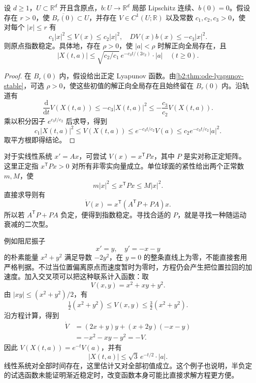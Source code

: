 \begin{proposition}\label{b2:prop:ode-lyapunov-exponential}
设 \(d\geq1\)，\(U\subset\mathbb R^d\) 开且含原点，\(b:U\to\mathbb R^d\) 局部 Lipschitz 连续、\(b(0)=0\)。假设存在 \(r>0\)，使 \(\overline{B_r(0)}\subset U\)，并存在 \(V\in C^1(U;\mathbb R)\) 以及常数 \(c_1,c_2,c_3>0\)，使对每个 \(|x|\leq r\) 有
\[
 c_1|x|^2\leq V(x)\leq c_2|x|^2,
 \quad DV(x)b(x)\leq-c_3|x|^2.
\]
则原点指数稳定。具体地，存在 \(\rho>0\)，使 \(|a|<\rho\) 时解正向全局存在，且
\[
 |X(t,a)|\leq\sqrt{c_2/c_1}\,e^{-c_3t/(2c_2)}\cdot|a|
 \quad(t\geq0).
\]
\end{proposition}
\begin{proof}
在 \(B_r(0)\) 内，假设给出正定 Lyapunov 函数。由\cref{b2:thm:ode-lyapunov-stable}，可选 \(\rho>0\)，使这些初值的解正向全局存在且始终留在 \(B_r(0)\) 内。沿轨道有
\[
 \frac{\mathrm d}{\mathrm dt}V(X(t,a))
 \leq-c_3|X(t,a)|^2
 \leq-\frac{c_3}{c_2}V(X(t,a)).
\]
乘以积分因子 \(e^{c_3t/c_2}\) 后求导，得到
\[
 c_1|X(t,a)|^2
 \leq V(X(t,a))
 \leq e^{-c_3t/c_2}V(a)
 \leq c_2e^{-c_3t/c_2}|a|^2.
\]
取平方根即得结论。
\end{proof}

对于实线性系统 \(x'=Ax\)，可尝试 \(V(x)=x^{\mathsf T}Px\)，其中 \(P\) 是实对称正定矩阵。这里正定指 \(x^{\mathsf T}Px>0\) 对所有非零实向量成立。单位球面的紧性给出两个正常数 \(m,M\)，使
\[
 m|x|^2\leq x^{\mathsf T}Px\leq M|x|^2.
\]
直接求导则有
\[
 \dot V(x)=x^{\mathsf T}(A^{\mathsf T}P+PA)x.
\]
所以若 \(A^{\mathsf T}P+PA\) 负定，便得到指数稳定。寻找合适的 \(P\)，就是寻找一种随运动衰减的二次型。

\ProseParagraphBreak

例如阻尼振子
\[
 x'=y,\quad y'=-x-y
\]
的朴素能量 \(x^2+y^2\) 满足导数 \(-2y^2\)，在 \(y=0\) 的整条直线上为零，不能直接套用严格判据。不过当位置偏离原点而速度暂时为零时，方程仍会产生把位置拉回的加速度。加入交叉项可以把这种联系计入函数：取
\[
 V(x,y)=x^2+xy+y^2.
\]
由 \(|xy|\leq(x^2+y^2)/2\)，有
\[
 \tfrac12(x^2+y^2)\leq V(x,y)\leq\tfrac32(x^2+y^2).
\]
沿方程计算，得到
\[
 \begin{aligned}
 \dot V
 &=(2x+y)y+(x+2y)(-x-y)\\
 &=-x^2-xy-y^2=-V.
 \end{aligned}
\]
因此 \(V(X(t,a))=e^{-t}V(a)\)，并有
\[
 |X(t,a)|\leq\sqrt3\,e^{-t/2}\cdot|a|.
\]
线性系统对全部时间存在，这里估计又对全部初值成立。这个例子也说明，半负定的试选函数未能证明渐近稳定时，改变函数本身可能比直接求解方程更方便。

\ProseParagraphBreak

